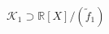 \documentclass[preview]{standalone}
\begin{document}
\begin{center}
$ \mathcal{K}_1 \supset \mathbb{R}[X]/(\tilde{f}_1)$
\end{center}
\end{document}
